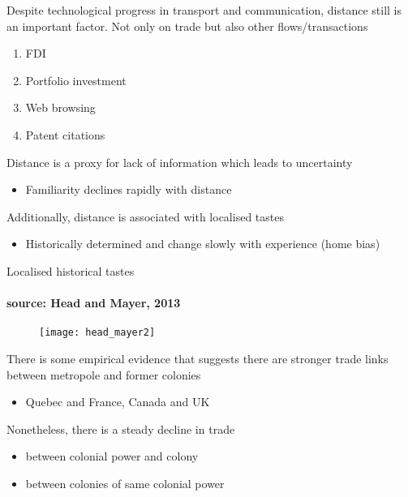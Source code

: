 \documentclass{beamer}
\begin{document}
\begin{frame}
  Despite technological progress in transport and communication, distance still is an important factor. 
  Not only on trade but also other flows/transactions
  \medskip
    \begin{enumerate}
      \item FDI
      \item Portfolio investment
      \item Web browsing
      \item Patent citations
    \end{enumerate}
\end{frame}

\begin{frame}
      Distance is a proxy for lack of information which leads to uncertainty
    \begin{itemize}
      \item Familiarity declines rapidly with distance
    \end{itemize}
    \medskip
    Additionally, distance is associated with localised tastes
    \begin{itemize}
      \item Historically determined and change slowly with experience (home bias)
    \end{itemize}
\end{frame}

\begin{frame}{Localised historical tastes}
\framesubtitle{source: Head and Mayer, 2013}
  \begin{figure}
    \texttt{[image: head\_mayer2]}
  \end{figure}  
\end{frame}

\begin{frame}
  There is some empirical evidence that suggests there are stronger trade links between metropole and former colonies
    \begin{itemize}
      \item Quebec and France, Canada and UK
    \end{itemize}
    \medskip
    Nonetheless, there is a steady decline in trade 
    \begin{itemize}
      \item between colonial power and colony
      \item between colonies of same colonial power
    \end{itemize}
\end{frame}
\end{document}
